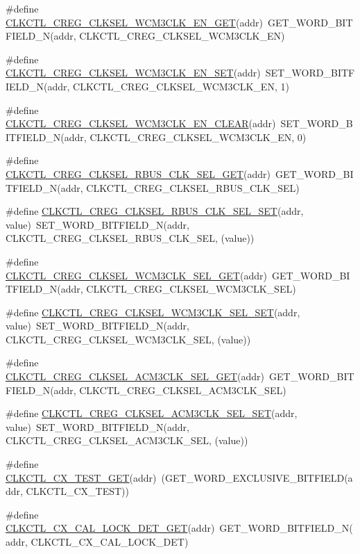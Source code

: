 \begin{DoxyCompactItemize}
\#define \hyperlink{a00544_a94c2516395b94f43473cf35ca5373840}{CLKCTL\_\-CREG\_\-CLKSEL\_\-WCM3CLK\_\-EN\_\-GET}(addr)~GET\_\-WORD\_\-BITFIELD\_\-N(addr, CLKCTL\_\-CREG\_\-CLKSEL\_\-WCM3CLK\_\-EN)
\item 
\#define \hyperlink{a00544_afcd6df930dca4dfc45624900b9cb29c1}{CLKCTL\_\-CREG\_\-CLKSEL\_\-WCM3CLK\_\-EN\_\-SET}(addr)~SET\_\-WORD\_\-BITFIELD\_\-N(addr, CLKCTL\_\-CREG\_\-CLKSEL\_\-WCM3CLK\_\-EN, 1)
\item 
\#define \hyperlink{a00544_a462a72c4de9c22ac5c7de1b49afed60e}{CLKCTL\_\-CREG\_\-CLKSEL\_\-WCM3CLK\_\-EN\_\-CLEAR}(addr)~SET\_\-WORD\_\-BITFIELD\_\-N(addr, CLKCTL\_\-CREG\_\-CLKSEL\_\-WCM3CLK\_\-EN, 0)
\item 
\#define \hyperlink{a00544_a74d2a0fea631f790794a643b4000b8c6}{CLKCTL\_\-CREG\_\-CLKSEL\_\-RBUS\_\-CLK\_\-SEL\_\-GET}(addr)~GET\_\-WORD\_\-BITFIELD\_\-N(addr, CLKCTL\_\-CREG\_\-CLKSEL\_\-RBUS\_\-CLK\_\-SEL)
\item 
\#define \hyperlink{a00544_abbd4dd9aa380091b9454eb66c8a99901}{CLKCTL\_\-CREG\_\-CLKSEL\_\-RBUS\_\-CLK\_\-SEL\_\-SET}(addr, value)~SET\_\-WORD\_\-BITFIELD\_\-N(addr, CLKCTL\_\-CREG\_\-CLKSEL\_\-RBUS\_\-CLK\_\-SEL, (value))
\item 
\#define \hyperlink{a00544_a8f179e64a365eea8bfcaf3066d9947e6}{CLKCTL\_\-CREG\_\-CLKSEL\_\-WCM3CLK\_\-SEL\_\-GET}(addr)~GET\_\-WORD\_\-BITFIELD\_\-N(addr, CLKCTL\_\-CREG\_\-CLKSEL\_\-WCM3CLK\_\-SEL)
\item 
\#define \hyperlink{a00544_a5af9690882bfe2c19bdb52020a3a4566}{CLKCTL\_\-CREG\_\-CLKSEL\_\-WCM3CLK\_\-SEL\_\-SET}(addr, value)~SET\_\-WORD\_\-BITFIELD\_\-N(addr, CLKCTL\_\-CREG\_\-CLKSEL\_\-WCM3CLK\_\-SEL, (value))
\item 
\#define \hyperlink{a00544_a639483ee98d2e5d5ed116969ea837db4}{CLKCTL\_\-CREG\_\-CLKSEL\_\-ACM3CLK\_\-SEL\_\-GET}(addr)~GET\_\-WORD\_\-BITFIELD\_\-N(addr, CLKCTL\_\-CREG\_\-CLKSEL\_\-ACM3CLK\_\-SEL)
\item 
\#define \hyperlink{a00544_a77802d9304e4a2fbe89c12722eef9eb0}{CLKCTL\_\-CREG\_\-CLKSEL\_\-ACM3CLK\_\-SEL\_\-SET}(addr, value)~SET\_\-WORD\_\-BITFIELD\_\-N(addr, CLKCTL\_\-CREG\_\-CLKSEL\_\-ACM3CLK\_\-SEL, (value))
\item 
\#define \hyperlink{a00544_a8cd284f450efc276a7b431521f5b5a5e}{CLKCTL\_\-CX\_\-TEST\_\-GET}(addr)~(GET\_\-WORD\_\-EXCLUSIVE\_\-BITFIELD(addr, CLKCTL\_\-CX\_\-TEST))
\item 
\#define \hyperlink{a00544_aa20012ee769546cb574cf3d1d7ed28a6}{CLKCTL\_\-CX\_\-CAL\_\-LOCK\_\-DET\_\-GET}(addr)~GET\_\-WORD\_\-BITFIELD\_\-N(addr, CLKCTL\_\-CX\_\-CAL\_\-LOCK\_\-DET)

\end{DoxyCompactItemize}

